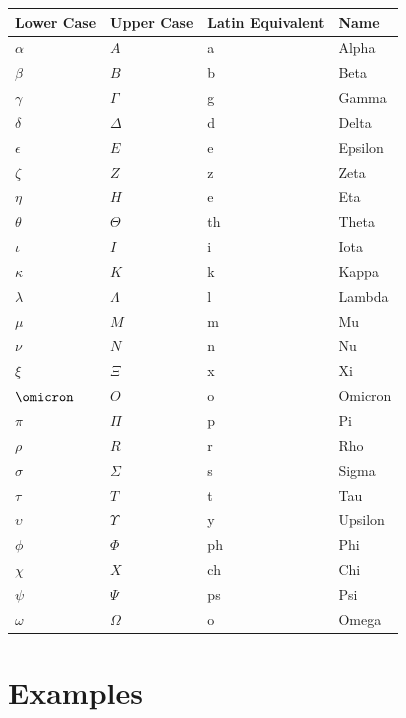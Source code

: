 \documentclass[
  letterpaper,
  DIV=11,
  numbers=noendperiod]{scrreprt}
\newcounter{none} %
\begin{document}
{\def\LTcaptype{none} %
\begin{longtable}[]{@{}llll@{}}
\toprule\noalign{}
Lower Case & Upper Case & Latin Equivalent & Name \\
\midrule\noalign{}
\endhead
\bottomrule\noalign{}
\endlastfoot
\(\alpha\) & \(A\) & a & Alpha \\
\(\beta\) & \(B\) & b & Beta \\
\(\gamma\) & \(\Gamma\) & g & Gamma \\
\(\delta\) & \(\Delta\) & d & Delta \\
\(\epsilon\) & \(E\) & e & Epsilon \\
\(\zeta\) & \(Z\) & z & Zeta \\
\(\eta\) & \(H\) & e & Eta \\
\(\theta\) & \(\Theta\) & th & Theta \\
\(\iota\) & \(I\) & i & Iota \\
\(\kappa\) & \(K\) & k & Kappa \\
\(\lambda\) & \(\Lambda\) & l & Lambda \\
\(\mu\) & \(M\) & m & Mu \\
\(\nu\) & \(N\) & n & Nu \\
\(\xi\) & \(\Xi\) & x & Xi \\
\(\omicron\) & \(O\) & o & Omicron \\
\(\pi\) & \(\Pi\) & p & Pi \\
\(\rho\) & \(R\) & r & Rho \\
\(\sigma\) & \(\Sigma\) & s & Sigma \\
\(\tau\) & \(T\) & t & Tau \\
\(\upsilon\) & \(\Upsilon\) & y & Upsilon \\
\(\phi\) & \(\Phi\) & ph & Phi \\
\(\chi\) & \(X\) & ch & Chi \\
\(\psi\) & \(\Psi\) & ps & Psi \\
\(\omega\) & \(\Omega\) & o & Omega \\
\end{longtable}
}

\section*{Examples}\label{examples-1}

\end{document}
